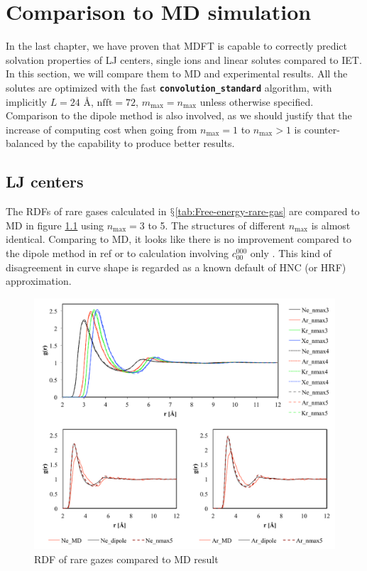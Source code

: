 
\chapter{Comparison to MD simulation\label{chpt:ions}}

In the last chapter, we have proven that \acs{MDFT} is capable to
correctly predict solvation properties of LJ centers, single ions
and linear solutes compared to \acs{IET}. In this section, we will
compare them to \acs{MD} and experimental results. All the solutes
are optimized with the fast \texttt{\textbf{convolution\_standard}}
algorithm, with implicitly $L=24$ $\textrm{Å}$, $\mathrm{nfft}=72$,
$m_{\max}=n_{\max}$ unless otherwise specified. Comparison to the
dipole method is also involved, as we should justify that the increase
of computing cost when going from $n_{\max}=1$ to $n_{\max}>1$ is
counter-balanced by the capability to produce better results. 

\section{LJ centers}

The \acs{RDF}s of rare gases calculated in $\mathsection$\ref{tab:Free-energy-rare-gas}
are compared to \acs{MD} in figure \ref{fig:rare-gazz} using $n_{\max}=3$
to 5. The structures of different $n_{\max}$ is almost identical.
Comparing to \acs{MD}, it looks like there is no improvement compared
to the dipole method in ref \citep{Zhao_2011} or to calculation involving
$c_{00}^{000}$ only \citep{levesque_scalar_2012}. This kind of disagreement
in curve shape is regarded as a known default of \acs{HNC} (or \acs{HRF})
approximation.

\begin{figure}[h]
\begin{centering}
\includegraphics[width=0.95\columnwidth]{_figure/results/rare_gaz}
\par\end{centering}
\caption{\acs{RDF} of rare gazes compared to \acs{MD} result\label{fig:rare-gazz}}
\end{figure}



